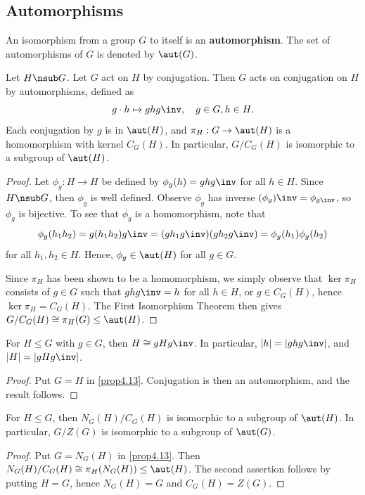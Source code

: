 \subsection{Automorphisms} \label{sec4.4}

 An isomorphism from a group $G$ to itself is an \textbf{automorphism}. The set of automorphisms of $G$ is denoted by $\aut(G)$.

 \label{prop4.13}
Let $H \nsub G$. Let $G$ act on $H$ by conjugation. Then $G$ acts on conjugation on $H$ by automorphisms, defined as
\[g \cdot h \mapsto ghg\inv, \quad g \in G, h \in H.\]
Each conjugation by $g$ is in $\aut(H)$, and $\pi_H : G \to \aut(H)$ is a homomorphism with kernel $C_G(H)$. In particular, $G/C_G(H)$ is isomorphic to a subgroup of $\aut(H)$.

\begin{proof}
    Let $\phi_g : H \to H$ be defined by $\phi_g(h) = ghg\inv$ for all $h \in H$. Since $H \nsub G$, then $\phi_g$ is well defined. Observe $\phi_g$ has inverse $(\phi_g)\inv = \phi_{g\inv}$, so $\phi_g$ is bijective. To see that $\phi_g$ is a homomorphism, note that
    \[\phi_g(h_1h_2) = g(h_1h_2)g\inv = (gh_1g\inv)(gh_2g\inv) = \phi_g(h_1)\phi_g(h_2)\]
    for all $h_1, h_2 \in H$. Hence, $\phi_g \in \aut(H)$ for all $g \in G$.

    Since $\pi_H$ has been shown to be a homomorphism, we simply observe that $\ker\pi_H$ consists of $g \in G$ such that $ghg\inv = h$ for all $h \in H$, or $g \in C_G(H)$, hence $\ker\pi_H = C_G(H)$. The First Isomorphism Theorem then gives $G/C_G(H) \cong \pi_H(G) \leq \aut(H)$.
\end{proof}

 \label{cor4.14}
For $H \leq G$ with $g \in G$, then $H \cong gHg\inv$. In particular, $|h| = |ghg\inv|$, and $|H| = |gHg\inv|$.

\begin{proof}
    Put $G = H$ in \autoref{prop4.13}. Conjugation is then an automorphism, and the result follows.
\end{proof}

 \label{cor4.15}
For $H \leq G$, then $N_G(H)/C_G(H)$ is isomorphic to a subgroup of $\aut(H)$. In particular, $G/Z(G)$ is isomorphic to a subgroup of $\aut(G)$.

\begin{proof}
    Put $G = N_G(H)$ in \autoref{prop4.13}. Then $N_G(H)/C_G(H) \cong \pi_H(N_G(H)) \leq \aut(H)$. The second assertion follows by putting $H = G$, hence $N_G(H) = G$ and $C_G(H) = Z(G)$.
\end{proof}

